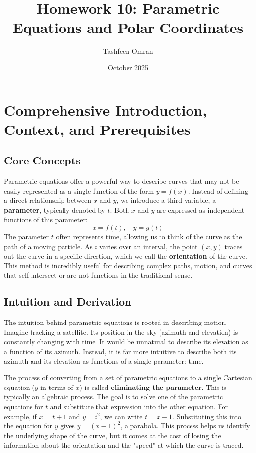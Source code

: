 \documentclass{article}
\title{Homework 10: Parametric Equations and Polar Coordinates}
\author{Tashfeen Omran}
\date{October 2025}
\begin{document}
\maketitle

\section{Comprehensive Introduction, Context, and Prerequisites}

\subsection{Core Concepts}
Parametric equations offer a powerful way to describe curves that may not be easily represented as a single function of the form \(y = f(x)\). Instead of defining a direct relationship between \(x\) and \(y\), we introduce a third variable, a \textbf{parameter}, typically denoted by \(t\). Both \(x\) and \(y\) are expressed as independent functions of this parameter:
\[
x = f(t), \quad y = g(t)
\]
The parameter \(t\) often represents time, allowing us to think of the curve as the path of a moving particle. As \(t\) varies over an interval, the point \((x, y)\) traces out the curve in a specific direction, which we call the \textbf{orientation} of the curve. This method is incredibly useful for describing complex paths, motion, and curves that self-intersect or are not functions in the traditional sense.

\subsection{Intuition and Derivation}
The intuition behind parametric equations is rooted in describing motion. Imagine tracking a satellite. Its position in the sky (azimuth and elevation) is constantly changing with time. It would be unnatural to describe its elevation as a function of its azimuth. Instead, it is far more intuitive to describe both its azimuth and its elevation as functions of a single parameter: time.

The process of converting from a set of parametric equations to a single Cartesian equation (\(y\) in terms of \(x\)) is called \textbf{eliminating the parameter}. This is typically an algebraic process. The goal is to solve one of the parametric equations for \(t\) and substitute that expression into the other equation. For example, if \(x = t+1\) and \(y = t^2\), we can write \(t = x-1\). Substituting this into the equation for \(y\) gives \(y = (x-1)^2\), a parabola. This process helps us identify the underlying shape of the curve, but it comes at the cost of losing the information about the orientation and the "speed" at which the curve is traced.
\end{document}
